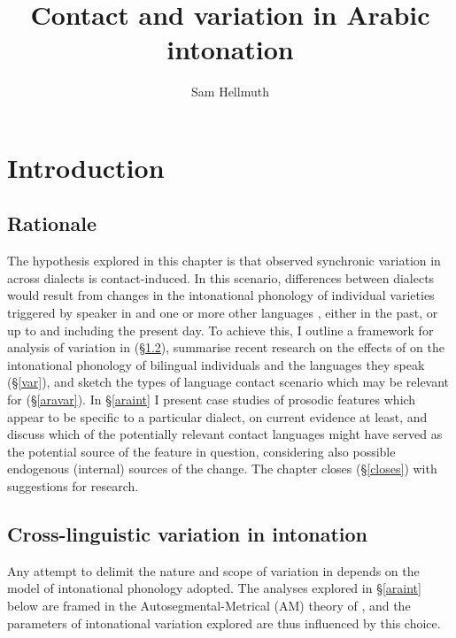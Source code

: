 \documentclass[output=paper]{langsci/langscibook}
\author{Sam Hellmuth\affiliation{University of York}}
\title{Contact and variation in Arabic intonation}
\begin{document}
\maketitle 
 
 

 \section{Introduction}


 \subsection{Rationale}


The hypothesis explored in this chapter is that observed synchronic variation in  across  dialects is contact-induced. In this scenario, differences between dialects would result from changes in the intonational phonology of individual varieties triggered by speaker  in  and one or more other languages \citep{Lucas2015}, either in the past, or up to and including the present day. To achieve this, I outline a framework for analysis of variation in  (§\ref{cross}), summarise recent research on the effects of  on the intonational phonology of bilingual individuals and the languages they speak (§\ref{var}), and sketch the types of language contact scenario which may be relevant for  (§\ref{aravar}). In §\ref{araint} I present case studies of prosodic features which appear to be specific to a particular dialect, on current evidence at least, and discuss which of the potentially relevant contact languages might have served as the potential source of the feature in question, considering also possible endogenous (internal) sources of the change. The chapter closes (§\ref{closes}) with suggestions for  research.


 
 \subsection{Cross-linguistic variation in intonation} \label{cross}


Any attempt to delimit the nature and scope of variation in  depends on the model of intonational phonology adopted. The analyses explored in §\ref{araint} below are framed in the Autosegmental-Metrical (AM) theory of  \citep{Ladd2008}, and the parameters of intonational variation explored are thus influenced by this choice. 
\end{document}
